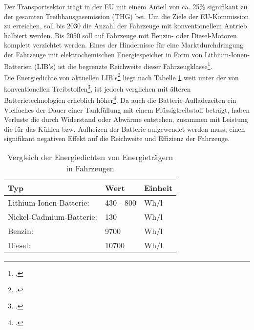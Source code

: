 Der Transportsektor trägt in der EU mit einem Anteil von ca. 25\% signifikant zu der gesamten Treibhausgasemission (THG) bei. Um die Ziele der EU-Kommission zu erreichen, soll bis 2030 die Anzahl der Fahrzeuge mit konventionellem Antrieb halbiert werden. Bis 2050 soll auf Fahrzeuge mit Benzin- oder Diesel-Motoren komplett verzichtet werden. Eines der Hindernisse für eine Marktdurchdringung der Fahrzeuge mit elektrochemischen Energiespeicher in Form von Lithium-Ionen-Batterien (LIB's) ist die begrenzte Reichweite dieser Fahrzeugklasse\footcite[Vgl.][S.136-146]{Ajanovic2020}.\\
Die Energiedichte von aktuellen LIB's\footcite[Vgl.\label{cite:Hettesheimer}][S. 11]{Hettesheimer2017} liegt nach Tabelle \ref{tab:Energiedichten} weit unter der von konventionellen Treibstoffen\footcite[Vgl.][]{BeloitEDU2021}, ist jedoch verglichen mit älteren Batterietechnologien erheblich höher\footcite[Vgl.][]{Sollmann2018}. Da auch die Batterie-Aufladezeiten ein Vielfaches der Dauer einer Tankfüllung mit einem Flüssigtreibstoff beträgt, haben Verluste die durch Widerstand oder Abwärme entstehen, zusammen mit Leistung die für das Kühlen bzw. Aufheizen der Batterie aufgewendet werden muss, einen signifikant negativen Effekt auf die Reichweite und Effizienz der Fahrzeuge.\\

\begin{table}[H]
	\caption{Vergleich der Energiedichten von Energieträgern in Fahrzeugen}
	\label{tab:Energiedichten}
	\vspace{0.2cm}	
	\begin{tabularx}{\textwidth}{ |X|X|X|  }
		\toprule[1.5pt]
		\textbf{Typ} & \textbf{Wert} & \textbf{Einheit} \\
		\hline\hline
		Lithium-Ionen-Batterie: & 430 - 800 & Wh/l \\
		\hline
		Nickel-Cadmium-Batterie: & 130 & Wh/l \\
		\hline
		Benzin: & 9700 & Wh/l \\
		\hline
		Diesel: & 10700 & Wh/l \\
		\bottomrule[1.5pt]
	\end{tabularx}		
\end{table}

